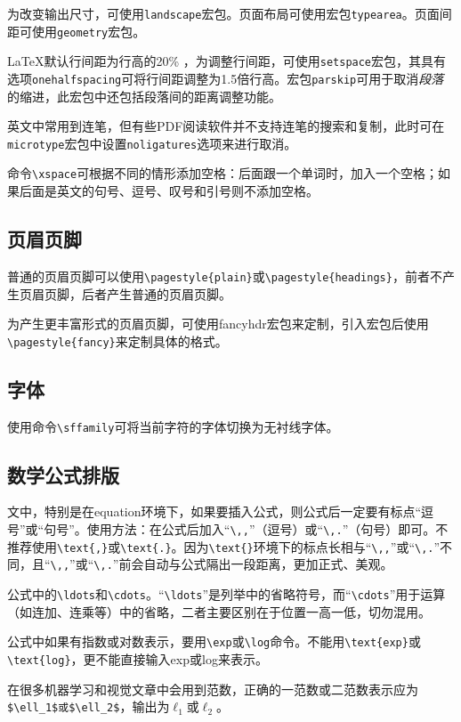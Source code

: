 \documentclass[11pt]{ctexart}
\begin{document}
为改变输出尺寸，可使用\verb|landscape|宏包。页面布局可使用宏包\verb|typearea|。页面间距可使用\verb|geometry|宏包。

\LaTeX 默认行间距为行高的20\% ，为调整行间距，可使用\verb|setspace|宏包，其具有选项\verb|onehalfspacing|可将行间距调整为1.5倍行高。宏包\verb|parskip|可用于取消\emph{段落}的缩进，此宏包中还包括段落间的距离调整功能。

英文中常用到连笔，但有些PDF阅读软件并不支持连笔的搜索和复制，此时可在\verb|microtype|宏包中设置\verb|noligatures|选项来进行取消。

命令\verb|\xspace|可根据不同的情形添加空格：后面跟一个单词时，加入一个空格；如果后面是英文的句号、逗号、叹号和引号则不添加空格。

\subsection{页眉页脚}
普通的页眉页脚可以使用\verb|\pagestyle{plain}|或\verb|\pagestyle{headings}|，前者不产生页眉页脚，后者产生普通的页眉页脚。

为产生更丰富形式的页眉页脚，可使用fancyhdr宏包来定制，引入宏包后使用\verb|\pagestyle{fancy}|来定制具体的格式。

\subsection{字体}
使用命令\verb|\sffamily|可将当前字符的字体切换为无衬线字体。

\subsection{数学公式排版}
文中，特别是在equation环境下，如果要插入公式，则公式后一定要有标点“逗号”或“句号”。使用方法：在公式后加入“\verb|\,,|”（逗号）或“\verb|\,.|”（句号）即可。不推荐使用\verb|\text{,}|或\verb|\text{.}|。因为\verb|\text{}|环境下的标点长相与“\verb|\,,|”或“\verb|\,.|”不同，且“\verb|\,,|”或“\verb|\,.|”前会自动与公式隔出一段距离，更加正式、美观。

公式中的\verb|\ldots|和\verb|\cdots|。“\verb|\ldots|”是列举中的省略符号，而“\verb|\cdots|”用于运算（如连加、连乘等）中的省略，二者主要区别在于位置一高一低，切勿混用。

公式中如果有指数或对数表示，要用\verb|\exp|或\verb|\log|命令。不能用\verb|\text{exp}|或\verb|\text{log}|，更不能直接输入exp或log来表示。

在很多机器学习和视觉文章中会用到范数，正确的一范数或二范数表示应为\verb|$\ell_1$或$\ell_2$|，输出为$\ell_1$或$\ell_2$。
\end{document}
